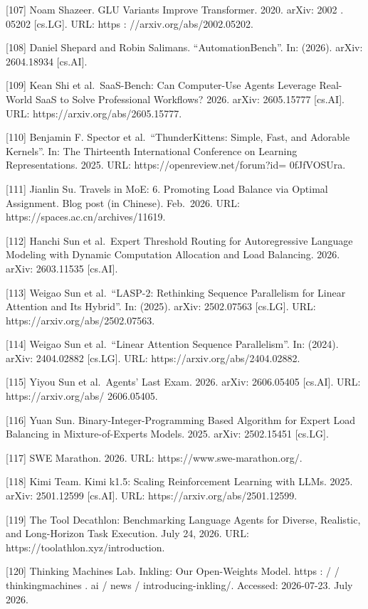 \documentclass[
  10
]{article}
\begin{document}
{[}107{]} Noam Shazeer. GLU Variants Improve Transformer. 2020. arXiv:
2002 . 05202 {[}cs.LG{]}. URL: https : //arxiv.org/abs/2002.05202.

{[}108{]} Daniel Shepard and Robin Salimans. ``AutomationBench''. In:
(2026). arXiv: 2604.18934 {[}cs.AI{]}.

{[}109{]} Kean Shi et al.~SaaS-Bench: Can Computer-Use Agents Leverage
Real-World SaaS to Solve Professional Workflows? 2026. arXiv: 2605.15777
{[}cs.AI{]}. URL: https://arxiv.org/abs/2605.15777.

{[}110{]} Benjamin F. Spector et al.~``ThunderKittens: Simple, Fast, and
Adorable Kernels''. In: The Thirteenth International Conference on
Learning Representations. 2025. URL: https://openreview.net/forum?id=
0fJfVOSUra.

{[}111{]} Jianlin Su. Travels in MoE: 6. Promoting Load Balance via
Optimal Assignment. Blog post (in Chinese). Feb.~2026. URL:
https://spaces.ac.cn/archives/11619.

{[}112{]} Hanchi Sun et al.~Expert Threshold Routing for Autoregressive
Language Modeling with Dynamic Computation Allocation and Load
Balancing. 2026. arXiv: 2603.11535 {[}cs.AI{]}.

{[}113{]} Weigao Sun et al.~``LASP-2: Rethinking Sequence Parallelism
for Linear Attention and Its Hybrid''. In: (2025). arXiv: 2502.07563
{[}cs.LG{]}. URL: https://arxiv.org/abs/2502.07563.

{[}114{]} Weigao Sun et al.~``Linear Attention Sequence Parallelism''.
In: (2024). arXiv: 2404.02882 {[}cs.LG{]}. URL:
https://arxiv.org/abs/2404.02882.

{[}115{]} Yiyou Sun et al.~Agents' Last Exam. 2026. arXiv: 2606.05405
{[}cs.AI{]}. URL: https://arxiv.org/abs/ 2606.05405.

{[}116{]} Yuan Sun. Binary-Integer-Programming Based Algorithm for
Expert Load Balancing in Mixture-of-Experts Models. 2025. arXiv:
2502.15451 {[}cs.LG{]}.

{[}117{]} SWE Marathon. 2026. URL: https://www.swe-marathon.org/.

{[}118{]} Kimi Team. Kimi k1.5: Scaling Reinforcement Learning with
LLMs. 2025. arXiv: 2501.12599 {[}cs.AI{]}. URL:
https://arxiv.org/abs/2501.12599.

{[}119{]} The Tool Decathlon: Benchmarking Language Agents for Diverse,
Realistic, and Long-Horizon Task Execution. July 24, 2026. URL:
https://toolathlon.xyz/introduction.

{[}120{]} Thinking Machines Lab. Inkling: Our Open-Weights Model. https
: / / thinkingmachines . ai / news / introducing-inkling/. Accessed:
2026-07-23. July 2026.
\end{document}
